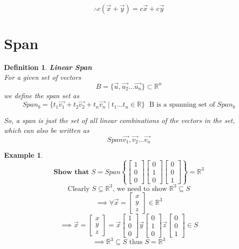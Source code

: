 \documentclass[twoside]{article}
\newtheorem{ex}[theorem]{Example}
\newtheorem{definition}[theorem]{Definition}
\begin{document}
$$\therefore c(\vec{x}+\vec{y})= c\vec{x} + c\vec{y}$$

\section{Span}
\begin{definition}
\textbf{Linear Span}
\\ For a given set of vectors \[B = \{ \vec{u} , \vec{u_2} \ldots \vec{u_n} \}  \subset \mathbb{R}^n \]
we define the span set as
\[ Span_b  = \{ t_1\vec{v_1} + t_2\vec{v_2} + t_n\vec{v_n} \mid t_1 \ldots t_n \in \mathbb{R}\} \, \  \ \text{B is a spanning set of } Span_b \]

So, a span is just the set of all linear combinations of the vectors in the set, which can also be written as
\[Span{\vec{v_1}, \vec{v_2} \ldots \vec{v_n}} \] 
\end {definition}

\newpage
\begin{ex}
\[\textbf{Show that  } S = Span\left\{ \begin{bmatrix} 1 \\ 0 \\ 0\end{bmatrix} \begin{bmatrix} 0 \\ 1 \\ 0\end{bmatrix} \begin{bmatrix} 0 \\ 0 \\ 1\end{bmatrix} \right\} = \mathbb{R}^3 \]
\[\text{Clearly } S \subseteq \mathbb{R}^3 \text{, we need to show } \mathbb{R}^3 \subseteq S \]
\[\implies \forall \vec{x} = \begin{bmatrix} x \\ y \\z \end{bmatrix} \in \mathbb{R}^3 \]
\[\implies \vec{x} =\begin{bmatrix} x \\ y \\z \end{bmatrix} =  \vec{x}\begin{bmatrix} 1 \\ 0 \\ 0\end{bmatrix} \vec{y}\begin{bmatrix} 0 \\ 1 \\ 0\end{bmatrix} \vec{z}\begin{bmatrix} 0 \\ 0 \\ 1\end{bmatrix}  \in S \]
\[\implies \mathbb{R}^3 \subseteq S \text{ thus } S = \mathbb{R}^3 \]
\end{ex}
\end{document}
